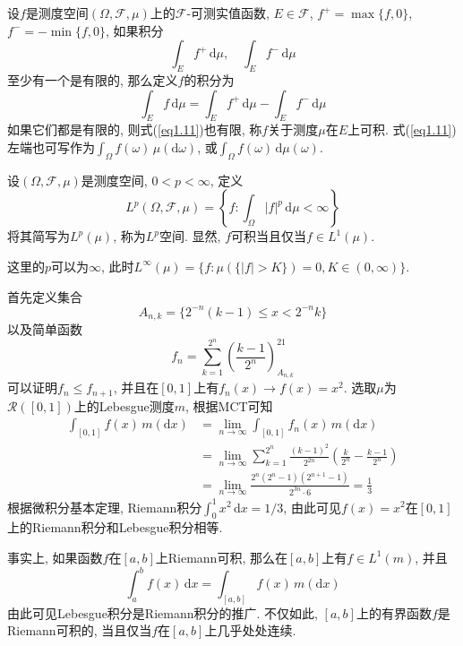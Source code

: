 \documentclass[cn, 12pt, math=mtpro2, bibstyle=apa, blue, twocol]{elegantbook}
\newcommand{\F}{\mathcal{F}}
\newcommand{\limn}{\lim_{n\to\infty}}
\newcommand{\du}{\,\text{d}\mu}
\begin{document}
\begin{definition}
设$f$是测度空间$(\Omega,\F,\mu)$上的$\F$-可测实值函数, $E\in\F$, $f^+=\max\{f,0\}$, $f^-=-\min\{f,0\}$, 如果积分
$$\int_E f^+\du,\quad \int_E f^-\du$$
至少有一个是有限的, 那么定义$f$的积分为
\begin{equation}\label{eq1.11}
  \int_Ef\du=\int_Ef^+\du-\int_Ef^-\du
\end{equation}
如果它们都是有限的, 则式(\ref{eq1.11})也有限, 称$f$关于测度$\mu$在$E$上可积. 式(\ref{eq1.11})左端也可写作为$\int_\Omega f(\omega)\,\mu(\text{d}\omega)$, 或$\int_\Omega f(\omega)\,\text{d}\mu(\omega)$.
\end{definition}

\begin{definition}
设$(\Omega,\F,\mu)$是测度空间, $0<p<\infty$, 定义
$$L^p(\Omega,\F,\mu)=\left\{f: \int_\Omega |f|^p\du<\infty\right\}$$
将其简写为$L^p(\mu)$, 称为$L^p$空间. 显然, $f$可积当且仅当$f\in L^1(\mu)$.
\end{definition}
\begin{remark}
这里的$p$可以为$\infty$, 此时$L^\infty(\mu)=\{f:\mu(\{|f|>K\})=0, K\in (0,\infty)\}$.
\end{remark}

\begin{example}[$\,$Lebesgue积分的计算]
首先定义集合
$$A_{n,k}=\{2^{-n}(k-1)\leq x< 2^{-n}k\}$$
以及简单函数
$$f_n=\sum_{k=1}^{2^n}\left(\frac{k-1}{2^n}\right)^21_{A_{n,k}}$$
可以证明$f_n\leq f_{n+1}$, 并且在$[0,1]$上有$f_n(x)\to f(x)=x^2$. 选取$\mu$为$\mathcal{R}([0,1])$上的Lebesgue测度$m$, 根据MCT可知
\begin{align*}
\int_{[0,1]}f(x)\,m(\text{d}x)&=\limn \int_{[0,1]}f_n(x)\,m(\text{d}x) \\
&=\limn \sum_{k=1}^{2^n}\frac{(k-1)^2}{2^{2n}}\left(\frac{k}{2^n}-\frac{k-1}{2^n}\right) \\
&=\limn \frac{2^n(2^n-1)(2^{n+1}-1)}{2^{3n}\cdot 6}=\frac{1}{3}
\end{align*}
根据微积分基本定理, Riemann积分$\int_{0}^{1}x^2\,\text{d}x=1/3$, 由此可见$f(x)=x^2$在$[0,1]$上的Riemann积分和Lebesgue积分相等.
\end{example}

事实上, 如果函数$f$在$[a,b]$上Riemann可积, 那么在$[a,b]$上有$f\in L^1(m)$, 并且
$$\int_{a}^{b}f(x)\,\text{d}x=\int_{[a,b]}f(x)\,m(\text{d}x)$$
由此可见Lebesgue积分是Riemann积分的推广. 不仅如此, $[a,b]$上的有界函数$f$是Riemann可积的, 当且仅当$f$在$[a,b]$上几乎处处连续.
\end{document}
